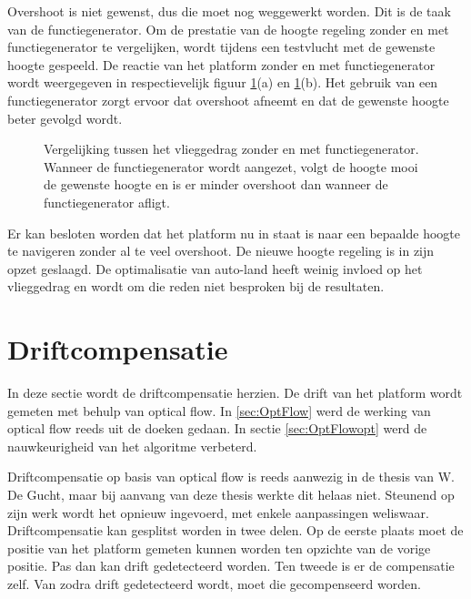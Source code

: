 \npar Overshoot is niet gewenst, dus die moet nog weggewerkt worden. Dit is de taak van de functiegenerator. Om de prestatie van de hoogte regeling zonder en met functiegenerator te vergelijken, wordt tijdens een testvlucht met de gewenste hoogte gespeeld. De reactie van het platform zonder en met functiegenerator wordt weergegeven in respectievelijk figuur \ref{fig:finaleHoogteRegeling}(a) en \ref{fig:finaleHoogteRegeling}(b). Het gebruik van een functiegenerator zorgt ervoor dat overshoot afneemt en dat de gewenste hoogte beter gevolgd wordt.

\begin{figure}
	\begin{center}
		
	\end{center}
	\centering
	\caption{Vergelijking tussen het vlieggedrag zonder en met functiegenerator. Wanneer de functiegenerator wordt aangezet, volgt de hoogte mooi de gewenste hoogte en is er minder overshoot dan wanneer de functiegenerator afligt.}\label{fig:finaleHoogteRegeling}
\end{figure}

\npar Er kan besloten worden dat het platform nu in staat is naar een bepaalde hoogte te navigeren zonder al te veel overshoot. De nieuwe hoogte regeling is in zijn opzet geslaagd. De optimalisatie van auto-land heeft weinig invloed op het vlieggedrag en wordt om die reden niet besproken bij de resultaten.


\section{Driftcompensatie}
In deze sectie wordt de driftcompensatie herzien. De drift van het platform wordt gemeten met behulp van optical flow. In \ref{sec:OptFlow} werd de werking van optical flow reeds uit de doeken gedaan. In sectie \ref{sec:OptFlowopt} werd de nauwkeurigheid van het algoritme verbeterd.

\npar Driftcompensatie op basis van optical flow is reeds aanwezig in de thesis van W. De Gucht, maar bij aanvang van deze thesis werkte dit helaas niet. Steunend op zijn werk wordt het opnieuw ingevoerd, met enkele aanpassingen weliswaar. Driftcompensatie kan gesplitst worden in twee delen. Op de eerste plaats moet de positie van het platform gemeten kunnen worden ten opzichte van de vorige positie. Pas dan kan drift gedetecteerd worden. Ten tweede is er de compensatie zelf. Van zodra drift gedetecteerd wordt, moet die gecompenseerd worden.

